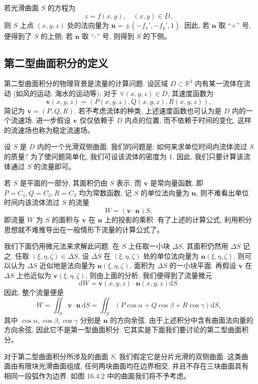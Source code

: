 \documentclass[UTF8, 12pt, fontset=fandol, oneside]{ctexart}
\begin{document}
若光滑曲面 $S$ 的方程为
\[
  z=f(x,y),\quad (x,y)\in D,
\]
则 $S$ 上点 $(x,y,z)$ 处的法向量为 $\boldsymbol n=\pm(-f_x',-f_y',1)$. 因此, 若 $\boldsymbol n$ 取 ``+'' 号, 便得到了 $S$ 的上侧; 若 $\boldsymbol n$ 取 ``-'' 号, 则得到 $S$ 的下侧。

\subsection{第二型曲面积分的定义}

第二型曲面积分的物理背景是流量的计算问题. 设区域 $D\subset\mathbb R^3$ 内有某一流体在流动 (如风的运动, 海水的运动等), 对于 $\forall(x,y,z)\in D$, 其速度函数为
\[
  \boldsymbol v(x,y,z)=(P(x,y,z),Q(x,y,z),R(x,y,z)),
\]
简记为 $\boldsymbol v=(P,Q,R)$. 若不考虑流体的种类, 上述速度函数也可认为是 $D$ 内的一个流速场. 进一步假设 $\boldsymbol v$ 仅仅依赖于 $D$ 内点的位置, 而不依赖于时间的变化, 这样的流速场也称为稳定流速场。

设 $S$ 是 $D$ 内的一个光滑双侧曲面. 我们的问题是: 如何来求单位时间内流体流过 $S$ 的质量? 为了使问题简单化, 我们可设该流体的密度为 1. 因此, 我们只要计算该流体通过 $S$ 的流量即可。

若 $S$ 是平面的一部分, 其面积仍由 $S$ 表示, 而 $\boldsymbol v$ 是常向量函数, 即 $P=C_1,Q=C_2,R=C_3$ 均为常数函数, 记 $S$ 的单位法向量为 $\boldsymbol n$, 则不难看出单位时间内该流体流过 $S$ 的流量
\[
  W=(\boldsymbol v\cdot\boldsymbol n)S,
\]
即流量 $W$ 为 $S$ 的面积与 $\boldsymbol v$ 在 $\boldsymbol n$ 上的投影的乘积. 有了上述的计算公式, 利用积分思想就不难推导出在一般情形下流量的计算公式了。

我们下面仍用微元法来求解此问题. 在 $S$ 上任取一小块 $\Delta S$, 其面积仍然用 $\Delta S$ 记之. 任取 $(\xi,\eta,\zeta)\in\Delta S$, 设 $\Delta S$ 在 $(\xi,\eta,\zeta)$ 处的单位法向量为 $\boldsymbol n(\xi,\eta,\zeta)$, 则可以认为 $\Delta S$ 近似地是法向量为 $\boldsymbol n(\xi,\eta,\zeta)$, 面积为 $\Delta S$ 的一小块平面. 再假设 $\boldsymbol v$ 在 $\Delta S$ 上也近似为 $\boldsymbol v(\xi,\eta,\zeta)$, 则由上面的分析, 我们便得到了流量微元
\[
  \mathrm dW=\boldsymbol v(x,y,z)\cdot\boldsymbol n(x,y,z)\mathrm dS.
\]
因此, 整个流量便是
\[
  W=\iint_S\boldsymbol v\cdot\boldsymbol n\,\mathrm dS
  =\iint_S(P\cos\alpha+Q\cos\beta+R\cos\gamma)\mathrm dS,
\]
其中 $\cos\alpha,\cos\beta,\cos\gamma$ 分别是 $\boldsymbol n$ 的方向余弦. 由于上述积分中含有曲面法向量的方向余弦, 因此它不是第一型曲面积分. 它其实是下面我们要讨论的第二型曲面积分。

对于第二型曲面积分所涉及的曲面 $S$, 我们假定它是分片光滑的双侧曲面. 这类曲面由有限块光滑曲面组成, 任何两块曲面均在边界相交, 并且不存在三块曲面具有相同一段弧作为边界. 如图 16.4.2 中的曲面我们将不予考虑。
\end{document}
